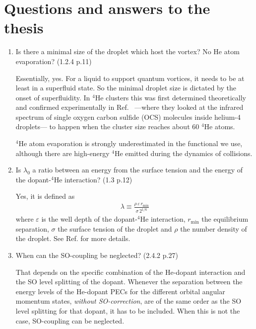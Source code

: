 \documentclass[11pt]{revtex4-1}
\newenvironment{QandA}{\begin{enumerate}[label=\bfseries\arabic*)]\bfseries}
                      {\end{enumerate}}
\newenvironment{answered}{\par\normalfont}{}
\begin{document}
\section{Questions and answers to the thesis}
	\begin{QandA}
		\item Is there a minimal size of the droplet which host the vortex? No He atom evaporation? (1.2.4 p.11)
		\begin{answered}
			Essentially, yes. For a liquid to support quantum vortices, it needs to be at least in a superfluid state. So the minimal droplet size is dictated by the onset of superfluidity. In $^4$He clusters this was first determined theoretically \cite{Sindzingre89,Pitaevskii90} and confirmed experimentally in Ref.~\cite{Grebenev98} ---where they looked at the infrared spectrum of single oxygen carbon sulfide (OCS) molecules inside helium-4 droplets--- to happen when the cluster size reaches about 60 $^4$He atoms. 

			$^4$He atom evaporation is strongly underestimated in the functional we use, although there are high-energy $^4$He emitted during the dynamics of collisions.
		\end{answered}
	
		\item Is $\lambda_0$ a ratio between an energy from the surface tension and the energy of the dopant-$^4$He interaction? (1.3 p.12)
		\begin{answered}
			Yes, it is defined as
			\begin{align*}
				\lambda\equiv\frac{\rho\,\varepsilon\,r_\mathrm{min}}{\sigma \,2^{1/6}}
			\end{align*}
			where $\varepsilon$ is the well depth of the dopant-$^4$He interaction, $r_\mathrm{min}$ the equilibrium separation, $\sigma$ the surface tension of the droplet and $\rho$ the number density of the droplet. See Ref. \cite{Ancilotto95} for more details.
		\end{answered}
		
		\item When can the SO-coupling be neglected? (2.4.2 p.27)
		\begin{answered}
			That depends on the specific combination of the He-dopant interaction and the SO level splitting of the dopant. Whenever the separation between the energy levels of the He-dopant PECs for the different orbital angular momentum states, \emph{without SO-correction}, are of the same order as the SO level splitting for that dopant, it has to be included. When this is not the case, SO-coupling can be neglected. 	\end{answered}
		

\end{QandA}
\end{document}

